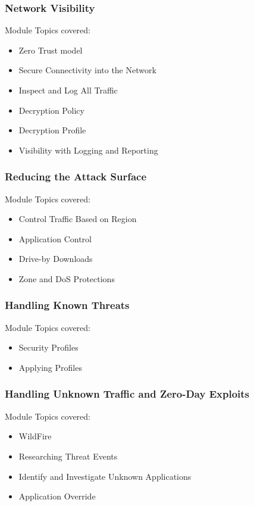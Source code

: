 \subsubsection{Network Visibility}

Module Topics covered:
\begin{itemize}
    \item Zero Trust model
    \item Secure Connectivity into the Network
    \item Inspect and Log All Traffic
    \item Decryption Policy
    \item Decryption Profile
    \item Visibility with Logging and Reporting
\end{itemize}

\subsubsection{Reducing the Attack Surface}
Module Topics covered:
\begin{itemize}
    \item Control Traffic Based on Region
    \item Application Control
    \item Drive-by Downloads
    \item Zone and DoS Protections
\end{itemize}

\subsubsection{Handling Known Threats}
Module Topics covered:
\begin{itemize}
    \item Security Profiles
    \item Applying Profiles
\end{itemize}

\subsubsection{Handling Unknown Traffic and Zero-Day Exploits}
Module Topics covered:
\begin{itemize}
    \item WildFire
    \item Researching Threat Events
    \item Identify and Investigate Unknown Applications
    \item Application Override
\end{itemize}

